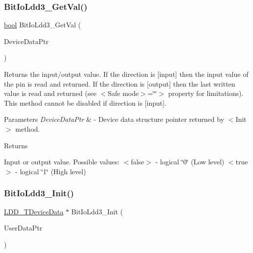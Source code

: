 \subsubsection{\texorpdfstring{Bit\+Io\+Ldd3\+\_\+\+Get\+Val()}{BitIoLdd3\_GetVal()}}
{\footnotesize\ttfamily \hyperlink{group___p_e___types__module_ga97a80ca1602ebf2303258971a2c938e2}{bool} Bit\+Io\+Ldd3\+\_\+\+Get\+Val (\begin{DoxyParamCaption}\item[{\hyperlink{group___p_e___types__module_gac5cf1362f1f0e3a2ce71b1bf2276d091}{L\+D\+D\+\_\+\+T\+Device\+Data} $\ast$}]{Device\+Data\+Ptr }\end{DoxyParamCaption})}



Returns the input/output value. If the direction is \mbox{[}input\mbox{]} then the input value of the pin is read and returned. If the direction is \mbox{[}output\mbox{]} then the last written value is read and returned (see $<$\+Safe mode$>$=\char`\"{}\char`\"{}$>$ property for limitations). This method cannot be disabled if direction is \mbox{[}input\mbox{]}. 


\begin{DoxyParams}{Parameters}
{\em Device\+Data\+Ptr} & -\/ Device data structure pointer returned by $<$\+Init$>$ method. \\
\hline
\end{DoxyParams}
\begin{DoxyReturn}{Returns}

\begin{DoxyItemize}
\item Input or output value. Possible values\+: $<$false$>$ -\/ logical \char`\"{}0\char`\"{} (Low level) $<$true$>$ -\/ logical \char`\"{}1\char`\"{} (High level) 
\end{DoxyItemize}
\end{DoxyReturn}
\mbox{\label{group___bit_io_ldd3__module_gaf15a33397436187afce41eff9523414f}} 
\subsubsection{\texorpdfstring{Bit\+Io\+Ldd3\+\_\+\+Init()}{BitIoLdd3\_Init()}}
{\footnotesize\ttfamily \hyperlink{group___p_e___types__module_gac5cf1362f1f0e3a2ce71b1bf2276d091}{L\+D\+D\+\_\+\+T\+Device\+Data} $\ast$ Bit\+Io\+Ldd3\+\_\+\+Init (\begin{DoxyParamCaption}\item[{\hyperlink{group___p_e___types__module_ga0b66a73f87238a782318aa0be7578e35}{L\+D\+D\+\_\+\+T\+User\+Data} $\ast$}]{User\+Data\+Ptr }\end{DoxyParamCaption})}



